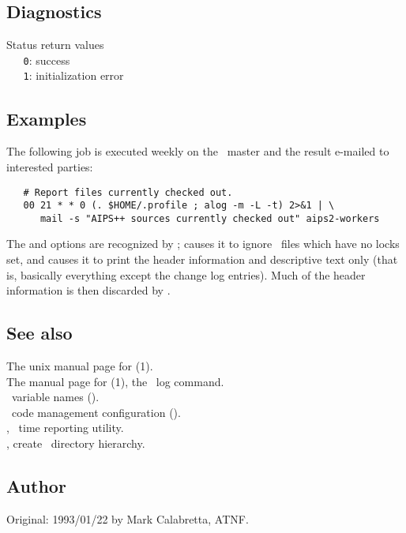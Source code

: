 \subsection*{Diagnostics}

Status return values
\\ \verb+   0+: success
\\ \verb+   1+: initialization error

\subsection*{Examples}

The following  job is executed weekly on the \aipspp\ master
and the result e-mailed to interested parties:

\begin{verbatim}
   # Report files currently checked out.
   00 21 * * 0 (. $HOME/.profile ; alog -m -L -t) 2>&1 | \
      mail -s "AIPS++ sources currently checked out" aips2-workers
\end{verbatim}

\noindent
The  and  options are recognized by ; 
causes it to ignore \rcs\ files which have no locks set, and \exe{-t} causes
it to print the header information and descriptive text only (that is,
basically everything except the change log entries).  Much of the header
information is then discarded by \exe{alog}.

\subsection*{See also}

The unix manual page for (1).\\
The manual page for (1), the \rcs\ log command.\\
\aipspp\ variable names ().\\
\aipspp\ code management configuration ().\\
\exeref{adate}, \aipspp\ time reporting utility.\\
, create \aipspp\ directory hierarchy.

\subsection*{Author}

Original: 1993/01/22 by Mark Calabretta, ATNF.

